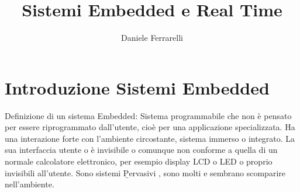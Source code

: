 \documentclass[]{article}
\title{Sistemi Embedded e Real Time}
\author{Daniele Ferrarelli}
\date{}
\begin{document}
\maketitle

\section{Introduzione Sistemi Embedded}
Definizione di un sistema Embedded: Sistema programmabile che non è pensato per essere riprogrammato dall'utente, cioè per una applicazione specializzata. Ha una interazione forte con l'ambiente circostante, sistema immerso o integrato.
La sua interfaccia utente o è invisibile o comunque non conforme a quella di un normale calcolatore elettronico, per esempio display LCD o LED o proprio invisibili all'utente. 
Sono sistemi \b{Pervasivi} , sono molti e sembrano scomparire nell'ambiente. 
\end{document}
